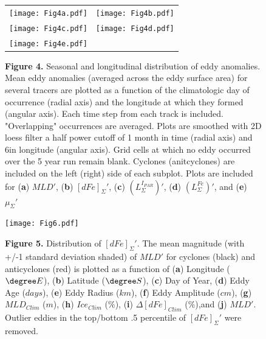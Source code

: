 
\begin{figure}[!htbp]
 \centering
 \begin{adjustwidth}{-1.5in}{-1.2in}
  \begin{tabular}{c c}
        \texttt{[image: Fig4a.pdf]} &
        \texttt{[image: Fig4b.pdf]} \\
        \texttt{[image: Fig4c.pdf]} &
        \texttt{[image: Fig4d.pdf]} \\
        \texttt{[image: Fig4e.pdf]} & \\
  \end{tabular}
 \end{adjustwidth}
\caption[Seasonal and longitudinal distribution of eddy anomalies]
{\textbf{Figure 4.} Seasonal and longitudinal distribution of eddy anomalies. Mean eddy anomalies (averaged across the eddy surface area) for several tracers are plotted as a function of the climatologic day of occurrence (radial axis) and the longitude at which they formed (angular axis). Each time step from each track is included. "Overlapping" occurrences are averaged. Plots are smoothed with 2D loess filter a half power cutoff of 1 month in time (radial axis) and 6\degree in longitude (angular axis). Grid cells at which no eddy occurred over the 5 year run remain blank. Cyclones (anitcyclones) are included on the left (right) side of each subplot. Plots are included for (\textbf{a}) $MLD'$, (\textbf{b}) $[dFe]_\Sigma'$, (\textbf{c}) $(L_\Sigma^{I_{PAR}})'$,   (\textbf{d}) $(L_\Sigma^{Fe})'$, and (\textbf{e}) $\mu_\Sigma'$}
\label{fig:Fig4}
\end{figure}


\begin{figure}[!htbp]
    \begin{adjustwidth}{-2.2in}{-1.2in}
    \centering
        \texttt{[image: Fig6.pdf]}
    \end{adjustwidth}
    \caption[{Distribution of $[dFe]_\Sigma'$.}]
    {\textbf{Figure 5.} Distribution of $[dFe]_\Sigma'$. The mean magnitude (with +/-1 standard deviation shaded) of $MLD'$ for cyclones (black) and anticyclones (red) is plotted as a function of (\textbf{a}) Longitude ($\degree E$), (\textbf{b}) Latitude ($\degree S$), (\textbf{c}) Day of Year, (\textbf{d}) Eddy Age ($days$), (\textbf{e}) Eddy Radius ($km$), (\textbf{f}) Eddy Amplitude ($cm$), (\textbf{g}) $MLD_{Clim}$ ($m$), (\textbf{h}) $Ice_{Clim}$ ($\%$), (\textbf{i}) $\Delta[dFe]_{Clim}$ ($\%$),and (\textbf{j}) $MLD'$. Outlier eddies in the top/bottom .5 percentile of $[dFe]_\Sigma'$ were removed.}
\label{fig:Fig5}
\end{figure}



